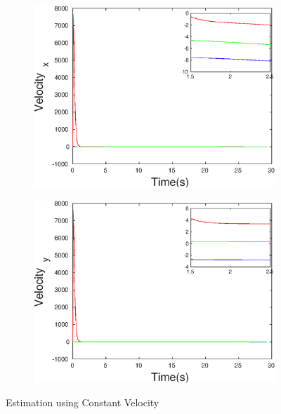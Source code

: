 \begin{figure}[h]
\begin{subfigure}{.5\linewidth}
\centering
\includegraphics[width=.9\linewidth]{figures/HInf/s3cvHInfVelocity_x}
\end{subfigure}
\begin{subfigure}{.5\linewidth}
\centering
\includegraphics[width=.9\linewidth]{figures/HInf/s3cvHInfVelocity_y}
\end{subfigure}
\caption{Estimation using Constant Velocity}
\end{figure}

